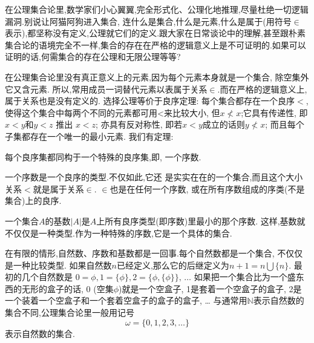 {在公理集合论里,数学家们小心翼翼,完全形式化、公理化地推理,尽量杜绝一切逻辑漏洞.别说让阿猫阿狗进入集合, 连什么是集合,什么是元素,什么是属于(用符号$\in$表示),都坚称没有定义,公理就它们的定义.跟大家在日常谈论中的理解,甚至跟朴素集合论的语境完全不一样,集合的存在在严格的逻辑意义上是不可证明的.如果可以证明的话,何需集合的存在公理和无限公理等等?

在公理集合论里没有真正意义上的元素,因为每个元素本身就是一个集合, 除空集外它又含元素. 所以,常用成员一词替代元素以表属于关系$\in$.而在严格的逻辑意义上,属于关系也是没有定义的.
选择公理等价于良序定理: 每个集合都存在一个良序$<$,使得这个集合中每两个不同的元素都可用<来比较大小, 但$x\nless x$;它具有传递性, 即 $x<y$和$y<z$ 推出 $x<z$; 
亦具有反对称性, 即若$x<y$成立的话则$y\nless x$;
而且每个子集都存在一个唯一的最小元素.
我们有定理:
\begin{kaishu}每个良序集都同构于一个特殊的良序集,即,
一个序数.
\end{kaishu}一个序数是一个良序的类型.不仅如此,它还
是实实在在的一个集合,而且这个大小关系$<$就是属于关系$\in$.
$\in$也是在任何一个序数, 或在所有序数组成的序类(不是集合)上的良序.

一个集合$A$的基数$|A|$是$A$上所有良序类型(即序数)里最小的那个序数.
这样,基数就不仅仅是一种类型.作为一种特殊的序数,它是一个具体的集合.

在有限的情形,自然数、序数和基数都是一回事.每个自然数都是一个集合,
不仅仅是一种比较类型.
如果自然数$n$已经定义,那么它的后继定义为$n+1= n\bigcup \{n\}$.
最初的几个自然数是
$0 = \phi, 1 = \{\phi\}, 2 = \{\phi, \{\phi\}\}, \,\dots$
如果把一个集合比为一个盛东西的无形的盒子的话, 0 (空集$\phi$)就是一个空盒子, 1是套着一个空盒子的盒子,
2是一个装着一个空盒子和一个套着空盒子的盒子的盒子, \dots
与通常用$\mathbb{N}$表示自然数的集合不同,公理集合论里一般用记号
$$\omega = \{0, 1, 2, 3, \dots\}$$
表示自然数的集合.

} %

